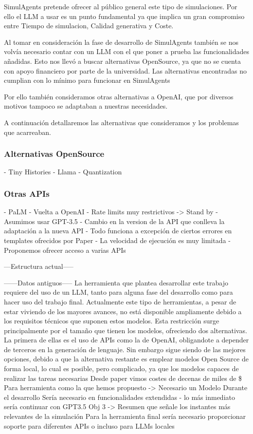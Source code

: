 SimulAgents pretende ofrecer al público general este tipo de simulaciones.
Por ello el LLM a usar es un punto fundamental ya que implica un gran compromiso entre Tiempo de simulacion, Calidad generativa y Coste.

Al tomar en consideración la fase de desarrollo de SimulAgents también se nos volvía necesario contar con un LLM con el que poner a prueba las funcionalidades añadidas.
Esto nos llevó a buscar alternativas OpenSource, ya que no se cuenta con apoyo financiero por parte de la universidad.
Las alternativas encontradas no cumplian con lo mínimo para funcionar en SimulAgents

Por ello también consideramos otras alternativas a OpenAI, que por diversos motivos tampoco se adaptaban a nuestras necesidades.

A continuación detallaremos las alternativas que consideramos y los problemas que acarreaban.

\subsubsection{Alternativas OpenSource}
 - Tiny Histories
 - Llama
 - Quantization
\subsubsection{Otras APIs}
 - PaLM
 - Vuelta a OpenAI
 	- Rate limits muy restrictivos -> Stand by
 	- Asumimos usar GPT-3.5
 	 - Cambio en la version de la API que conlleva la adaptación a la nueva API
 	 - Todo funciona a excepción de ciertos errores en templates ofrecidos por Paper
 	 - La velocidad de ejecución es muy limitada
 	 - Proponemos ofrecer acceso a varias APIs

---Estructura actual-----

------Datos antiguos-----
La herramienta que plantea desarrollar este trabajo requiere del uso de un LLM, tanto para alguna fase del desarrollo como para hacer uso del trabajo final. Actualmente este tipo de herramientas, a pesar de estar viviendo de los mayores avances, no está disponible ampliamente debido a los requisitos técnicos que suponen estos modelos. Esta restricción surge principalmente por el tamaño que tienen los modelos, ofreciendo dos alternativas. La primera de ellas es el uso de APIs como la de OpenAI, obligandote a depender de terceros en la generación de lenguaje. Sin embargo sigue siendo de las mejores opciones, debido a que la alternativa restante es emplear modelos Open Source de forma local, lo cual es posible, pero complicado, ya que los modelos capaces de realizar las tareas necesarias 
Desde paper vimos costes de decenas de miles de \$
Para herramienta como la que hemos propuesto -> Necesario un Modelo
Durante el desarrollo Sería necesario en funcionalidades extendidas - lo más inmediato sería continuar con GPT3.5
	Obj 3 -> Resumen que señale los instantes más relevantes de la simulación
Para la herramienta final sería necesario proporcionar soporte para diferentes APIs o incluso para LLMs locales

